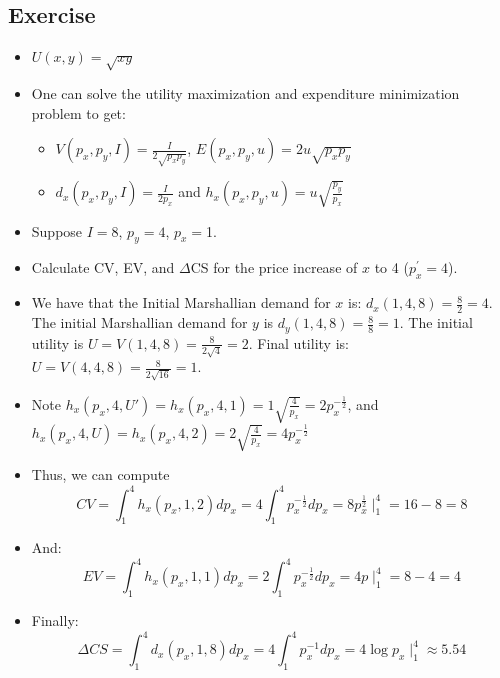 \documentclass[11pt,english]{article}
\begin{document}
\subsection{Exercise}
\begin{itemize}
\item $U(x,y)=\sqrt{xy}$
\item One can solve the utility maximization and expenditure minimization
problem to get:
\begin{itemize}
\item $V(p_{x},p_{y},I)=\frac{I}{2\sqrt{p_{x}p_{y}}}$, $E(p_{x},p_{y},u)=2u\sqrt{p_{x}p_{y}}$
\item $d_{x}(p_{x},p_{y},I)=\frac{I}{2p_{x}}$ and $h_{x}(p_{x},p_{y},u)=u\sqrt{\frac{p_{y}}{p_{x}}}$
\end{itemize}
\item Suppose $I=8$, $p_{y}=4$, $p_{x}=$1.
\item Calculate CV, EV, and $\Delta$CS for the price increase of $x$ to
4 ($p_{x}^{'}=4$). 
\item We have that the Initial Marshallian demand for $x$ is: \textbf{$d_{x}(1,4,8)=\frac{8}{2}=4$}.
The initial Marshallian demand for $y$ is $d_{y}(1,4,8)=\frac{8}{8}=1$.
The initial utility is $U=V(1,4,8)=\frac{8}{2\sqrt{4}}=2$. Final
utility is: $U=V(4,4,8)=\frac{8}{2\sqrt{16}}=1$.
\item Note $h_{x}(p_{x},4,U')=h_{x}(p_{x},4,1)=1\sqrt{\frac{4}{p_{x}}}=2p_{x}^{-\frac{1}{2}}$,
and $h_{x}(p_{x},4,U)=h_{x}(p_{x},4,2)=2\sqrt{\frac{4}{p_{x}}}=4p_{x}^{-\frac{1}{2}}$
\item Thus, we can compute
\[
CV=\int_{1}^{4}h_{x}(p_{x},1,2)dp_{x}=4\int_{1}^{4}p_{x}^{-\frac{1}{2}}dp_{x}=8p_{x}^{\frac{1}{2}}\mid_{1}^{4}=16-8=8
\]
\item And:
\[
EV=\int_{1}^{4}h_{x}(p_{x},1,1)dp_{x}=2\int_{1}^{4}p_{x}^{-\frac{1}{2}}dp_{x}=4p\mid_{1}^{4}=8-4=4
\]
\item Finally:
\[
\Delta CS=\int_{1}^{4}d_{x}(p_{x},1,8)dp_{x}=4\int_{1}^{4}p_{x}^{-1}dp_{x}=4\log p_{x}\mid_{1}^{4}\approx5.54
\]
\end{itemize}
\end{document}
